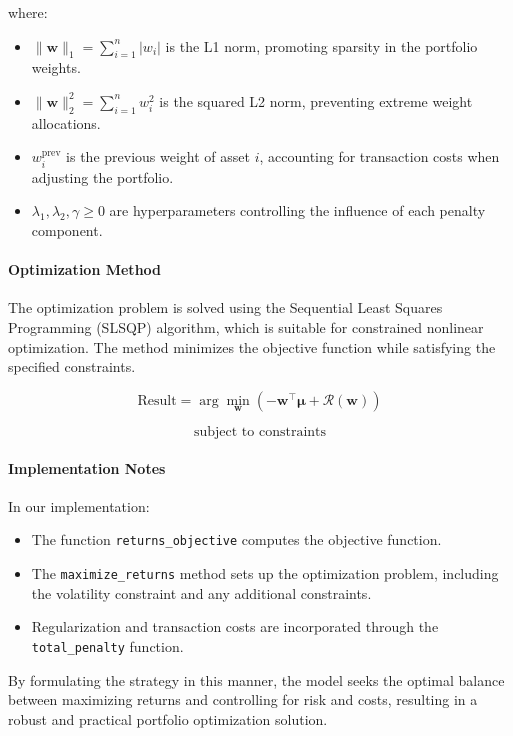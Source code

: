 where:

\begin{itemize}
    \item \( \|\mathbf{w}\|_1 = \sum_{i=1}^n |w_i| \) is the L1 norm, promoting sparsity in the portfolio weights.
    \item \( \|\mathbf{w}\|_2^2 = \sum_{i=1}^n w_i^2 \) is the squared L2 norm, preventing extreme weight allocations.
    \item \( w_i^{\text{prev}} \) is the previous weight of asset \( i \), accounting for transaction costs when adjusting the portfolio.
    \item \( \lambda_1, \lambda_2, \gamma \geq 0 \) are hyperparameters controlling the influence of each penalty component.
\end{itemize}

\paragraph{Optimization Method}

The optimization problem is solved using the Sequential Least Squares Programming (SLSQP) algorithm, which is suitable for constrained nonlinear optimization. The method minimizes the objective function while satisfying the specified constraints.

\[
\text{Result} = \arg\min_{\mathbf{w}} \left( -\mathbf{w}^\top \boldsymbol{\mu} + \mathcal{R}(\mathbf{w}) \right)
\]

\[
\text{subject to constraints}
\]

\paragraph{Implementation Notes}

In our implementation:

\begin{itemize}
    \item The function \texttt{returns\_objective} computes the objective function.
    \item The \texttt{maximize\_returns} method sets up the optimization problem, including the volatility constraint and any additional constraints.
    \item Regularization and transaction costs are incorporated through the \texttt{total\_penalty} function.
\end{itemize}

By formulating the strategy in this manner, the model seeks the optimal balance between maximizing returns and controlling for risk and costs, resulting in a robust and practical portfolio optimization solution.


